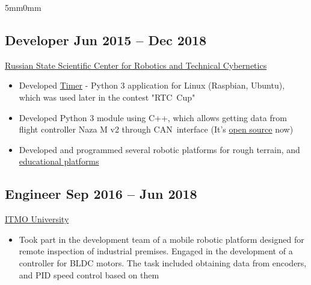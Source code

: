 \documentclass[10pt]{article}
\newcommand{\lmvalue}{5mm}
\newcommand{\rmvalue}{0mm}
\begin{document}
\begin{changemargin}{\lmvalue}{\rmvalue}
        \subsection*{Developer \hfill {\color{gray}Jun 2015 – Dec 2018}}
        \href{https://er.rtc.ru/en/}{Russian State Scientific Center for
        Robotics and Technical Cybernetics}
        \begin{itemize}
            \item Developed
            \href{https://github.com/RTC-SCTB/cuptimer}{Timer} - Python 3 application for
            Linux (Raspbian, Ubuntu), which was used later in the contest "RTC~Cup"
            \item Developed Python 3 module using C++, which allows getting
            data from flight controller Naza M v2 through CAN~interface (It's
            \href{https://github.com/viktorvorobev/NazaCanDecoder}{open source} now)
            \item Developed and programmed several robotic platforms for
            rough terrain, and \href{https://rtc.ru/solution/agro-robot/}{educational platforms}
        \end{itemize}

        \subsection*{Engineer \hfill {\color{gray}Sep 2016 – Jun 2018}}
        \href{https://en.itmo.ru/}{ITMO University}
        \begin{itemize}
            \item Took part in the development team of a mobile robotic
            platform designed for remote inspection of industrial premises.
            Engaged in the development of a controller for BLDC motors.
            The task included obtaining data from encoders, and PID speed control based on them
        \end{itemize}
    \end{changemargin}
\end{document}
